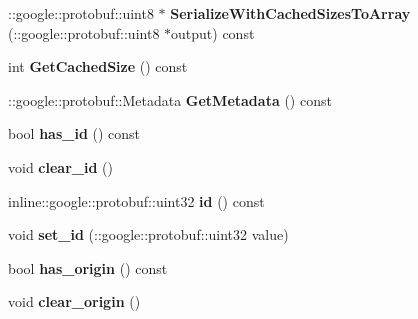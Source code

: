 \begin{DoxyCompactItemize}
\item 
\hypertarget{classvss__state_1_1Global__State_a55efb24ef78b4e7eff557a1c7fd5d7e4}{\-::google\-::protobuf\-::uint8 $\ast$ {\bfseries Serialize\-With\-Cached\-Sizes\-To\-Array} (\-::google\-::protobuf\-::uint8 $\ast$output) const }\label{classvss__state_1_1Global__State_a55efb24ef78b4e7eff557a1c7fd5d7e4}

\item 
\hypertarget{classvss__state_1_1Global__State_aa94066556db76353540b8b54d77eed2e}{int {\bfseries Get\-Cached\-Size} () const }\label{classvss__state_1_1Global__State_aa94066556db76353540b8b54d77eed2e}

\item 
\hypertarget{classvss__state_1_1Global__State_a3b2d5b30093df0eb8b20f991dc2d8d9e}{\-::google\-::protobuf\-::\-Metadata {\bfseries Get\-Metadata} () const }\label{classvss__state_1_1Global__State_a3b2d5b30093df0eb8b20f991dc2d8d9e}

\item 
\hypertarget{classvss__state_1_1Global__State_a7d7595f10e8923fada79b67c77ba7cd3}{bool {\bfseries has\-\_\-id} () const }\label{classvss__state_1_1Global__State_a7d7595f10e8923fada79b67c77ba7cd3}

\item 
\hypertarget{classvss__state_1_1Global__State_a0b001773d7aafdb5acef5b36c35f7075}{void {\bfseries clear\-\_\-id} ()}\label{classvss__state_1_1Global__State_a0b001773d7aafdb5acef5b36c35f7075}

\item 
\hypertarget{classvss__state_1_1Global__State_ab0ff3c2867cdfda57429a649c9abde17}{inline\-::google\-::protobuf\-::uint32 {\bfseries id} () const }\label{classvss__state_1_1Global__State_ab0ff3c2867cdfda57429a649c9abde17}

\item 
\hypertarget{classvss__state_1_1Global__State_a183935ca3daee149b526d4a50cce450e}{void {\bfseries set\-\_\-id} (\-::google\-::protobuf\-::uint32 value)}\label{classvss__state_1_1Global__State_a183935ca3daee149b526d4a50cce450e}

\item 
\hypertarget{classvss__state_1_1Global__State_ab80313b62ce603f182c3e2e1fbea8da5}{bool {\bfseries has\-\_\-origin} () const }\label{classvss__state_1_1Global__State_ab80313b62ce603f182c3e2e1fbea8da5}

\item 
\hypertarget{classvss__state_1_1Global__State_a60aa49b36faa6533ed70bc9e01208282}{void {\bfseries clear\-\_\-origin} ()}\label{classvss__state_1_1Global__State_a60aa49b36faa6533ed70bc9e01208282}


\end{DoxyCompactItemize}
